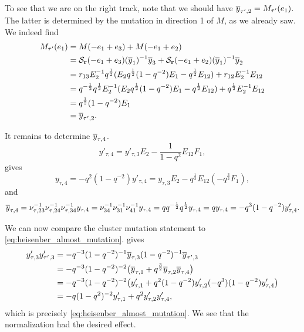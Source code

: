 \begin{example}
	To see that we are on the right track, note that we should have $\overline{y}_{\tau', 2} =
		M_{\tau'}(e_1)$. The latter is determined by the mutation in direction 1 of $M$, as we
	already saw. We indeed find
	\begin{align*}
		M_{\tau'}(e_1)
		 & = M(-e_1 + e_3) + M(-e_1 + e_2)                                                                                                        \\
		 & = \mathcal{S}_{\mathbf{r}}(-e_1 + e_3)(\overline{y}_1)^{-1} \overline{y}_3 + \mathcal{S}_{\mathbf{r}}(-e_1 + e_2)(\overline{y}_1)^{-1} \overline{y}_2                                                  \\
		 & = r_{13} E_2^{-1} q^{\frac{1}{2}}(E_2 q^{\frac{1}{2}}(1-q^{-2})E_1 - q^{\frac{1}{2}}E_{12}) + r_{12} E_2^{-1} E_{12}                     \\
		 & = q^{-\frac{1}{2}} q^{\frac{1}{2}} E_2^{-1} (E_2 q^{\frac{1}{2}}(1-q^{-2})E_1 - q^{\frac{1}{2}}E_{12}) + q^{\frac{1}{2}} E_2^{-1} E_{12} \\
		 & = q^{\frac{1}{2}}(1-q^{-2})E_1                                                                                                         \\
		 & = \overline{y}_{\tau', 2}.
	\end{align*}

	It remains to determine $\overline{y}_{\tau, 4}$.
	\begin{equation*}
		y'_{\tau, 4} = y'_{\tau,3}E_2 -\frac{1}{1-q^2}E_{12}F_1,
	\end{equation*}
	gives
	\begin{equation*}
		y_{\tau, 4} = -q^2 (1-q^{-2}) y'_{\tau, 4} = y_{\tau, 3} E_2 - q^{\frac{1}{2}}E_{12}(-q^{\frac{3}{2}}F_1),
	\end{equation*}
	and
	\begin{equation*}
		\overline{y}_{\tau, 4} = \nu_{\tau, 23}^{-1} \nu_{\tau, 24}^{-1} \nu_{\tau, 34}^{-1} y_{\tau, 4} = \nu_{34}^{-1} \nu_{31}^{-1} \nu_{41}^{-1} y_{\tau, 4} = q q^{-\frac{1}{2}}q^{\frac{1}{2}} y_{\tau, 4} = qy_{\tau, 4} = -q^3(1-q^{-2})y'_{\tau, 4}.
	\end{equation*}

	We can now compare the cluster mutation statement to
	\cref{eq:heisenber_almost_mutation}.  gives
	\begin{align*}
		y'_{\tau, 3}y'_{\tau', 3}
		 & = -q^{-3}(1-q^{-2})^{-1} \overline{y}_{\tau, 3} (1-q^{-2})^{-1} \overline{y}_{\tau', 3}                                         \\
		 & = -q^{-3}(1-q^{-2})^{-2}\bigl( \overline{y}_{\tau, 1} + q^{\frac{3}{2}}\overline{y}_{\tau, 2}\overline{y}_{\tau, 4}             \bigr) \\
		 & = -q^{-3}(1-q^{-2})^{-2}\bigl(y'_{\tau, 1} + q^{2}(1-q^{-2})y'_{\tau, 2}(-q^3)(1-q^{-2})y'_{\tau, 4}\bigr)  \\
		 & = -q (1-q^2)^{-2} y'_{\tau, 1} + q^2 y'_{\tau, 2}y'_{\tau, 4},
	\end{align*}
	which is precisely \cref{eq:heisenber_almost_mutation}. We see that the normalization
	had the desired effect.

\end{example}

